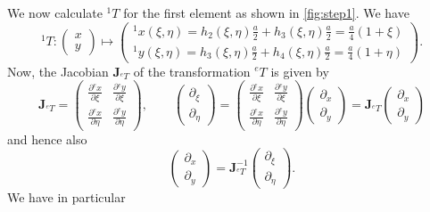 \documentclass[a4paper,11pt]{article}
\numberwithin{equation}{section}
\newcommand\matr[1]{\ensuremath{\boldsymbol{\mathbf{#1}}}}
\begin{document}
{We now calculate ${}^1 T$ for the first element as shown in \cref{fig:step1}. We have \begin{equation}{}^1 T : \begin{pmatrix}
		x \\ y
	\end{pmatrix} \mapsto
	\begin{pmatrix}	{}^1 x(\xi,\eta) =  h_2(\xi,\eta)\frac{a}{2} + h_3(\xi,\eta)\frac{a}{2} = \frac{a}{4}(1+\xi) \\
		{}^1 y(\xi,\eta) = h_3(\xi,\eta)\frac{a}{2} + h_4(\xi,\eta)\frac{a}{2} = \frac{a}{4}(1+\eta)\end{pmatrix}.
\end{equation} Now, the Jacobian $\matr{J}_{{}^e T}$ of the transformation ${}^e T$ is given by \begin{equation}
	\matr{J}_{{}^e T} = \begin{pmatrix}
		\frac{\partial {}^e x}{\partial \xi} & \frac{\partial {}^e y}{\partial \xi} \\
		\frac{\partial {}^e x}{\partial \eta} & \frac{\partial {}^e y}{\partial \eta}\end{pmatrix}, \qquad \begin{pmatrix}
		\partial_\xi \\ \partial_\eta
	\end{pmatrix} = \begin{pmatrix}
		\frac{\partial {}^e x}{\partial \xi} & \frac{\partial {}^e y}{\partial \xi} \\
		\frac{\partial {}^e x}{\partial \eta} & \frac{\partial {}^e y}{\partial \eta}\end{pmatrix}\begin{pmatrix}
		\partial_x \\ \partial_y
	\end{pmatrix}= \matr{J}_{{}^e T}\begin{pmatrix}
		\partial_x \\ \partial_y
	\end{pmatrix}
\end{equation} and hence also \begin{equation}
	\begin{pmatrix}
		\partial_x \\ \partial_y
	\end{pmatrix} = \matr{J}_{{}^e T}^{-1} \begin{pmatrix}
		\partial_\xi \\ \partial_\eta
	\end{pmatrix}.
\end{equation} We have in particular \begin{equation}

\end{equation}}
\end{document}
